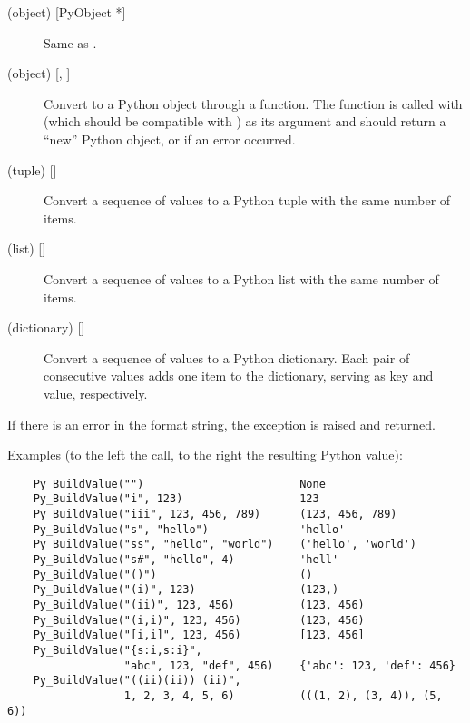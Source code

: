 \documentclass{manual}
\begin{document}
\begin{description}
\item[ (object) {[PyObject *]}]
Same as .

\item[ (object) {[, ]}]
Convert  to a Python object through a 
function.  The function is called with  (which should be
compatible with ) as its argument and should return a
``new'' Python object, or \NULL{} if an error occurred.

\item[ (tuple) {[]}]
Convert a sequence of \C{} values to a Python tuple with the same number
of items.

\item[ (list) {[]}]
Convert a sequence of \C{} values to a Python list with the same number
of items.

\item[ (dictionary) {[]}]
Convert a sequence of \C{} values to a Python dictionary.  Each pair of
consecutive \C{} values adds one item to the dictionary, serving as key
and value, respectively.

\end{description}

If there is an error in the format string, the
 exception is raised and \NULL{} returned.

Examples (to the left the call, to the right the resulting Python value):

\begin{verbatim}
    Py_BuildValue("")                        None
    Py_BuildValue("i", 123)                  123
    Py_BuildValue("iii", 123, 456, 789)      (123, 456, 789)
    Py_BuildValue("s", "hello")              'hello'
    Py_BuildValue("ss", "hello", "world")    ('hello', 'world')
    Py_BuildValue("s#", "hello", 4)          'hell'
    Py_BuildValue("()")                      ()
    Py_BuildValue("(i)", 123)                (123,)
    Py_BuildValue("(ii)", 123, 456)          (123, 456)
    Py_BuildValue("(i,i)", 123, 456)         (123, 456)
    Py_BuildValue("[i,i]", 123, 456)         [123, 456]
    Py_BuildValue("{s:i,s:i}",
                  "abc", 123, "def", 456)    {'abc': 123, 'def': 456}
    Py_BuildValue("((ii)(ii)) (ii)",
                  1, 2, 3, 4, 5, 6)          (((1, 2), (3, 4)), (5, 6))
\end{verbatim}
\end{document}
